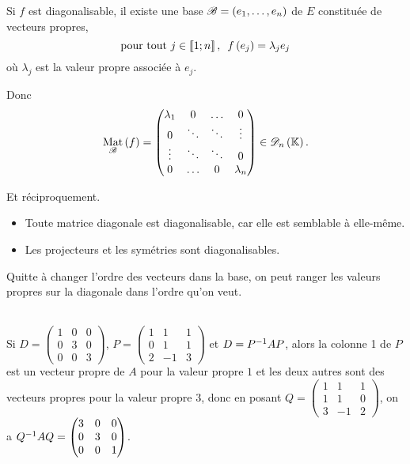 \begin{dem}
Si \(f\) est diagonalisable, il existe une base \(\mathscr{B}=\left(e_1,\dots,e_n\right)\) de \(E\) constituée de vecteurs propres, \ie \[\quantifs{\tpt j\in\interventierii{1}{n}}f\paren{e_j}=\lambda_je_j\] où \(\lambda_j\) est la valeur propre associée à \(e_j\).

Donc \[\Mat{f}=\begin{pmatrix}
\lambda_1 & 0 & \dots & 0 \\
0 & \ddots & \ddots & \vdots \\
\vdots & \ddots & \ddots & 0 \\
0 & \dots & 0 & \lambda_n
\end{pmatrix}\in\diago{n}.\]

Et réciproquement.
\end{dem}

\begin{ex}
\begin{itemize}
    \item Toute matrice diagonale est diagonalisable, car elle est semblable à elle-même. \\
    \item Les projecteurs et les symétries sont diagonalisables.
\end{itemize}
\end{ex}

\begin{rem}
Quitte à changer l'ordre des vecteurs dans la base, on peut ranger les valeurs propres sur la diagonale dans l'ordre qu'on veut.
\end{rem}

\begin{ex}~\\
Si \(D=\begin{pmatrix}
1 & 0 & 0 \\
0 & 3 & 0 \\
0 & 0 & 3
\end{pmatrix}\), \(P=\begin{pmatrix}
1 & 1 & 1 \\
0 & 1 & 1 \\
2 & -1 & 3
\end{pmatrix}\) et \(D=P^{-1} AP\), alors la colonne 1 de \(P\) est un vecteur propre de \(A\) pour la valeur propre \(1\) et les deux autres sont des vecteurs propres pour la valeur propre \(3\), donc en posant \(Q=\begin{pmatrix}
1 & 1 & 1 \\
1 & 1 & 0 \\
3 & -1 & 2
\end{pmatrix}\), on a \(Q^{-1} AQ=\begin{pmatrix}
3 & 0 & 0 \\
0 & 3 & 0 \\
0 & 0 & 1
\end{pmatrix}\).
\end{ex}

